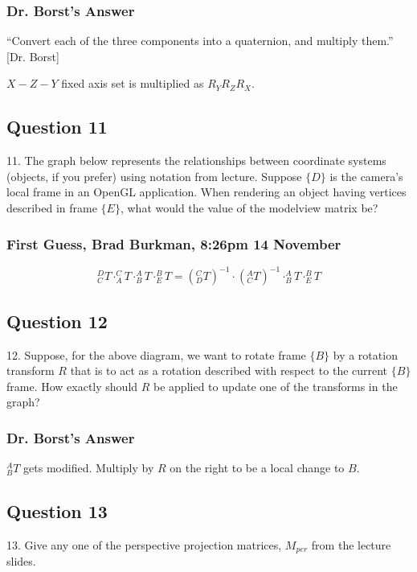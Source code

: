 \documentclass[11pt]{article}
\begin{document}
\begin{spacing}{1.2}
\subsubsection{Dr. Borst's Answer}

``Convert each of the three components into a quaternion, and multiply them.'' [Dr. Borst]

$X-Z-Y$ fixed axis set is multiplied as $R_YR_ZR_X$.


\subsection{Question 11}
11.  The graph below represents the relationships between coordinate systems (objects, if you prefer) using notation from lecture.  Suppose $\{D\}$ is the camera's local frame in an OpenGL application.  When rendering an object having vertices described in frame $\{E\}$, what would the value of the modelview matrix be?

\subsubsection{First Guess, Brad Burkman, 8:26pm 14 November}

$$
	^D_CT \cdot 
	^C_AT \cdot 
	^A_BT \cdot 
	^B_ET = 
	\left( ^C_DT \right)^{-1} \cdot
	\left( ^A_CT \right)^{-1} \cdot
	^A_BT \cdot 
	^B_ET
	$$
	
\subsection{Question 12}
12.  Suppose, for the above diagram, we want to rotate frame $\{B\}$ by a rotation transform $R$ that is to act as a rotation described with respect to the  current $\{B\}$ frame.  How exactly should $R$ be applied to update one of the transforms in the graph?

\subsubsection{Dr. Borst's Answer}

$^A_BT$ gets modified.  Multiply by $R$ on the right to be a local change to $B$.  


\subsection{Question 13}
13.  Give any one of the perspective projection matrices, $M_{per}$ from the lecture slides.  


\end{spacing}
\end{document}
